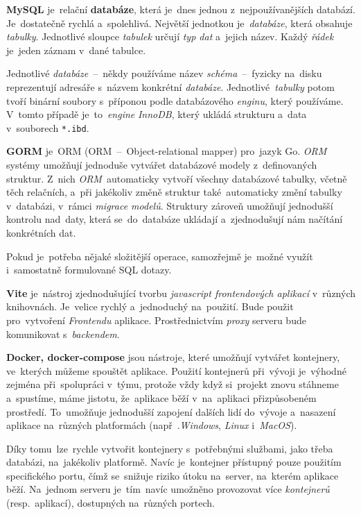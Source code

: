 \documentclass[10pt,a4paper]{article}
\begin{document}
            \textbf{MySQL} je~relační \textbf{databáze}, která je~dnes jednou z~nejpoužívanějších databází. Je~dostatečně rychlá a~spolehlivá. Největší jednotkou je~\emph{databáze}, která obsahuje \emph{tabulky}. Jednotlivé sloupce \emph{tabulek} určují \emph{typ dat} a~jejich název. Každý \emph{řádek} je~jeden záznam v~dané tabulce.\cite{databases21}
            
            Jednotlivé \emph{databáze}~--~někdy používáme název \emph{schéma}~--~fyzicky na~disku reprezentují adresáře s~názvem konkrétní \emph{databáze}. Jednotlivé~\emph{tabulky} potom tvoří binární soubory s~příponou podle databázového \emph{enginu}, který používáme. V~tomto případě je~to~\emph{engine} \emph{InnoDB}, který ukládá strukturu a~data v~souborech \texttt{*.ibd}. \cite{MySQLInnoDB}
            
            \textbf{GORM} je~ORM (ORM~--~Object-relational mapper) pro~jazyk Go. \emph{ORM} systémy umožňují jednoduše vytvářet databázové modely z~definovaných struktur. Z~nich \emph{ORM}~automaticky vytvoří všechny databázové tabulky, včetně těch relačních, a~při jakékoliv změně struktur také~automaticky změní tabulky v~databázi, v~rámci \emph{migrace modelů}. Struktury zároveň umožňují jednodušší kontrolu nad~daty, která se~do~databáze ukládají a~zjednodušují nám načítání konkrétních dat.

            Pokud je~potřeba nějaké složitější operace, samozřejmě je~možné využít i~samostatně formulované SQL dotazy. \cite{gormGORM, freecodecamp:orm}

            \textbf{Vite} je~nástroj zjednodušující tvorbu \emph{javascript frontendových aplikací} v~různých knihovnách. Je~velice rychlý a~jednoduchý na~použití. Bude použit pro~vytvoření \emph{Frontendu} aplikace. Prostřednictvím \emph{proxy} serveru bude komunikovat s~\emph{backendem}.

            \textbf{Docker, docker-compose} jsou nástroje, které umožňují vytvářet kontejnery, ve~kterých můžeme spouštět aplikace. Použití kontejnerů při~vývoji je~výhodné zejména při~spolupráci v~týmu, protože vždy když si~projekt znovu stáhneme a~spustíme, máme jistotu, že~aplikace běží v~na~aplikaci přizpůsobeném prostředí. To~umožňuje jednodušší zapojení dalších lidí do~vývoje a~nasazení aplikace na~různých platformách (např~.\emph{Windows}, \emph{Linux} i~\emph{MacOS}).

            Díky tomu~lze~rychle vytvořit kontejnery s~potřebnými službami, jako třeba databázi, na~jakékoliv platformě. Navíc je~kontejner přístupný pouze použitím specifického portu, čímž se~snižuje riziko útoku na~server, na~kterém aplikace běží. Na~jednom serveru je~tím~navíc umožněno provozovat více \emph{kontejnerů} (resp.~aplikací), dostupných na~různých portech. \cite{docker, dockernginxperformance}
\end{document}
